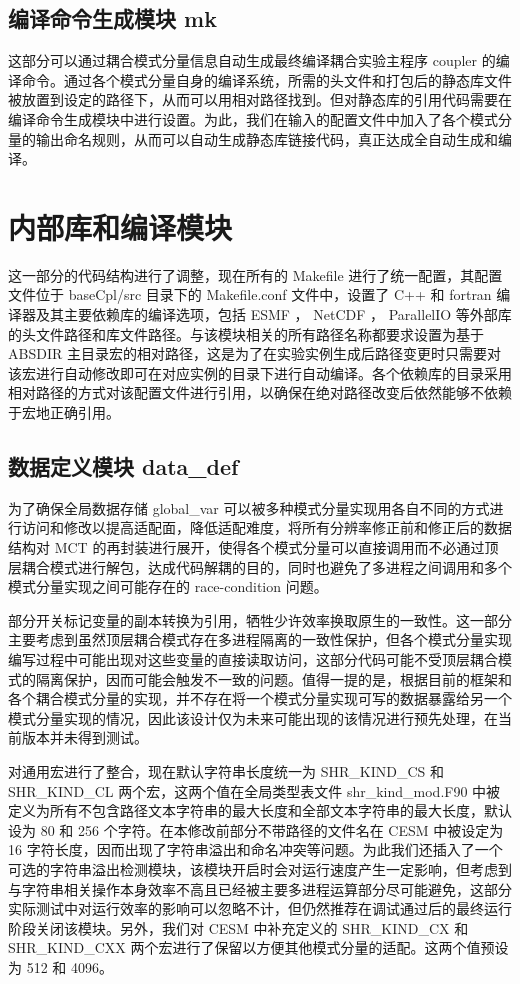 \subsection{编译命令生成模块 mk}

这部分可以通过耦合模式分量信息自动生成最终编译耦合实验主程序 coupler 的编译命令。通过各个模式分量自身的编译系统，所需的头文件和打包后的静态库文件被放置到设定的路径下，从而可以用相对路径找到。但对静态库的引用代码需要在编译命令生成模块中进行设置。为此，我们在输入的配置文件中加入了各个模式分量的输出命名规则，从而可以自动生成静态库链接代码，真正达成全自动生成和编译。

\section{内部库和编译模块}

这一部分的代码结构进行了调整，现在所有的 Makefile 进行了统一配置，其配置文件位于 baseCpl/src 目录下的 Makefile.conf 文件中，设置了 C++ 和 fortran 编译器及其主要依赖库的编译选项，包括 ESMF ， NetCDF ， ParallelIO 等外部库的头文件路径和库文件路径。与该模块相关的所有路径名称都要求设置为基于 ABSDIR 主目录宏的相对路径，这是为了在实验实例生成后路径变更时只需要对该宏进行自动修改即可在对应实例的目录下进行自动编译。各个依赖库的目录采用相对路径的方式对该配置文件进行引用，以确保在绝对路径改变后依然能够不依赖于宏地正确引用。

\subsection{数据定义模块 data\_def}

为了确保全局数据存储 global\_var 可以被多种模式分量实现用各自不同的方式进行访问和修改以提高适配面，降低适配难度，将所有分辨率修正前和修正后的数据结构对 MCT 的再封装进行展开，使得各个模式分量可以直接调用而不必通过顶层耦合模式进行解包，达成代码解耦的目的，同时也避免了多进程之间调用和多个模式分量实现之间可能存在的 race-condition 问题。

部分开关标记变量的副本转换为引用，牺牲少许效率换取原生的一致性。这一部分主要考虑到虽然顶层耦合模式存在多进程隔离的一致性保护，但各个模式分量实现编写过程中可能出现对这些变量的直接读取访问，这部分代码可能不受顶层耦合模式的隔离保护，因而可能会触发不一致的问题。值得一提的是，根据目前的框架和各个耦合模式分量的实现，并不存在将一个模式分量实现可写的数据暴露给另一个模式分量实现的情况，因此该设计仅为未来可能出现的该情况进行预先处理，在当前版本并未得到测试。

对通用宏进行了整合，现在默认字符串长度统一为 SHR\_KIND\_CS 和 SHR\_KIND\_CL 两个宏，这两个值在全局类型表文件 shr\_kind\_mod.F90 中被定义为所有不包含路径文本字符串的最大长度和全部文本字符串的最大长度，默认设为 80 和 256 个字符。在本修改前部分不带路径的文件名在 CESM 中被设定为 16 字符长度，因而出现了字符串溢出和命名冲突等问题。为此我们还插入了一个可选的字符串溢出检测模块，该模块开启时会对运行速度产生一定影响，但考虑到与字符串相关操作本身效率不高且已经被主要多进程运算部分尽可能避免，这部分实际测试中对运行效率的影响可以忽略不计，但仍然推荐在调试通过后的最终运行阶段关闭该模块。另外，我们对 CESM 中补充定义的 SHR\_KIND\_CX 和 SHR\_KIND\_CXX 两个宏进行了保留以方便其他模式分量的适配。这两个值预设为 512 和 4096。

